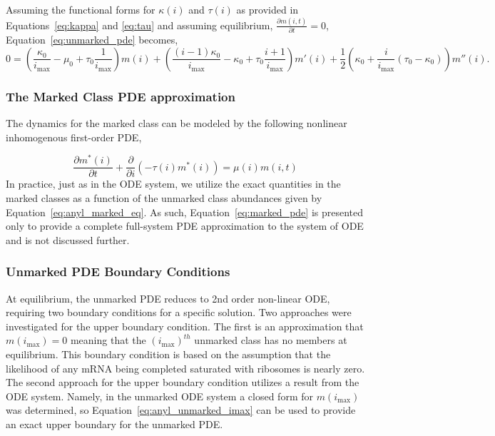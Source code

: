 \documentclass[review]{elsarticle}
\newcommand{\imax}{\ensuremath{i_{\max}}\xspace}
\newcommand\p[2]{\frac{\partial #1}{\partial #2}}
\begin{document}
Assuming the functional forms for $\kappa(i)$ and $\tau(i)$ as provided in Equations~\ref{eq:kappa} and \ref{eq:tau} and assuming equilibrium, $\p{m(i,t)}{t}=0$, Equation~\ref{eq:unmarked_pde} becomes,
\begin{equation}
0=\left(\frac{\kappa_0}{\imax}-\mu_0+\tau_0\frac{1}{\imax}\right)m(i)+\left(\frac{(i-1)\kappa_0}{\imax}-\kappa_0+\tau_0\frac{i+1}{\imax}\right)m'(i)+\frac{1}{2}\left(\kappa_0+ \frac{i}{\imax}\left(\tau_0-\kappa_0\right)\right)m''(i).
\end{equation}
\subsubsection{The Marked Class PDE approximation}
The dynamics for the marked class can be modeled by the following nonlinear inhomogenous first-order PDE,

\begin{equation}\label{eq:marked_pde}
\frac{\partial m^*(i)}{\partial t}+\frac{\partial}{\partial i}\left(-\tau(i)m^*(i)\right)=\mu(i)m(i,t)
\end{equation}
In practice, just as in the ODE system, we utilize the exact quantities in the marked classes as a function of the unmarked class abundances given by Equation~\ref{eq:anyl_marked_eq}.
As such, Equation~\ref{eq:marked_pde} is presented only to provide a complete full-system PDE approximation to the system of ODE and is not discussed further.

\subsubsection{Unmarked PDE Boundary Conditions}
At equilibrium, the unmarked PDE reduces to 2nd order non-linear ODE, requiring two boundary conditions for a specific solution.
Two approaches were investigated for the upper boundary condition.
The first is an approximation that $m(\imax)=0$ meaning  that the $(\imax)^{th}$ unmarked class has no members at equilibrium.
This boundary condition is based on the assumption that the likelihood of any mRNA being completed saturated with ribosomes is nearly zero.
The second approach for the upper boundary condition utilizes a result from the ODE system.
Namely, in the unmarked ODE system a closed form for $m(\imax)$ was determined, so Equation~\ref{eq:anyl_unmarked_imax} can be used to provide an exact upper boundary for the unmarked PDE.
\end{document}
